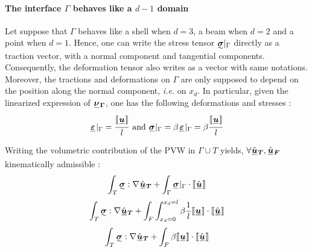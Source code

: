 \documentclass[fleqn]{article}
\begin{document}
            \paragraph{The interface $\Gamma$ behaves like a $d-1$ domain}
            Let suppose that $\Gamma$ behaves like a shell when $d = 3$, a beam when $d = 2$ and a point when $d = 1$. Hence, one can write the stress tensor $\tensorii{\sigma} \vert_{\Gamma}$ directly as a traction vector, with a normal component and tangential components. Consequently, the deformation tensor also writes as a vector with same notations.
            \newline
            Moreover, the tractions and deformations on $\Gamma$ are only supposed to depend on the position along the normal component, \textit{i.e.} on $x_d$.
            \newline
            In particular, given the linearized expression of $\tensori{\nu}\subscript{\bm{\Gamma}}$, one has the following deformations and stresses :
            \begin{equation}
                \tensori{\varepsilon}\vert_{\Gamma} = \frac{\llbracket \tensori{u} \rrbracket}{l}
                \mbox{ and }
                \tensori{\sigma}\vert_{\Gamma} = \beta \tensori{\varepsilon}\vert_{\Gamma} = \beta \frac{\llbracket \tensori{u} \rrbracket}{l}
            \end{equation}

            Writing the volumetric contribution of the PVW in $\Gamma \cup T$ yields, $\forall \hat{\tensori{u}}\subscript{\bm{T}}, \hat{\tensori{u}}\subscript{\bm{F}}$ kinematically admissible :
            \begin{equation}
                \label{PVW_1}
                \int_T \tensorii{\sigma} : \nabla \hat{\tensori{u}}\subscript{\bm{T}} + \int_\Gamma \tensori{\sigma} \vert_{\Gamma} \cdot \llbracket \hat{\tensori{u}} \rrbracket
            \end{equation}
            \begin{equation}
                \int_T \tensorii{\sigma} : \nabla \hat{\tensori{u}}\subscript{\bm{T}} + \int_F \int_{x_d = 0}^{x_d = l} \beta \frac{1}{l} \llbracket \tensori{u} \rrbracket \cdot \llbracket \hat{\tensori{u}} \rrbracket
            \end{equation}
            \begin{equation}
                \int_T \tensorii{\sigma} : \nabla \hat{\tensori{u}}\subscript{\bm{T}} + \int_F \beta \llbracket \tensori{u} \rrbracket \cdot \llbracket \hat{\tensori{u}} \rrbracket
            \end{equation}
\end{document}
